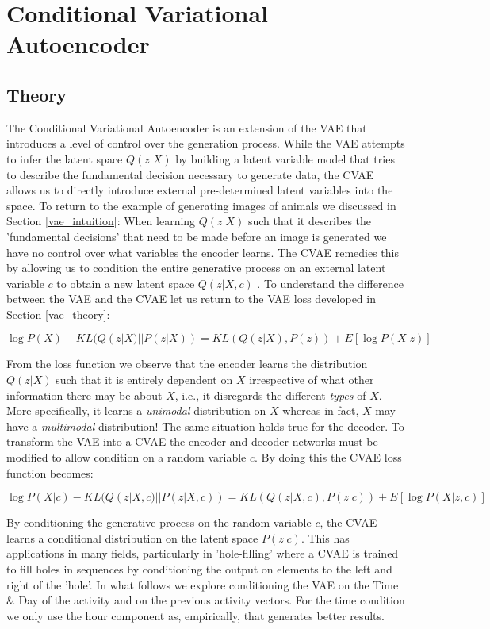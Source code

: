 \section{Conditional Variational Autoencoder}
\subsection{Theory}
The Conditional Variational Autoencoder is an extension of the VAE that introduces a level of control over the generation process. While the VAE attempts to infer the latent space $Q(z|X)$ by building a latent variable model that tries to describe the fundamental decision necessary to generate data, the CVAE allows us to directly introduce external pre-determined latent variables into the space. To return to the example of generating images of animals we discussed in Section \ref{vae_intuition}: When learning $Q(z|X)$ such that it describes the 'fundamental decisions' that need to be made before an image is generated we have no control over what variables the encoder learns. The CVAE remedies this by allowing us to condition the entire generative process on an external latent variable $c$ to obtain a new latent space $Q(z|X,c)$ \citep{sohn2015learning}. To understand the difference between the VAE and the CVAE let us return to the VAE loss developed in Section \ref{vae_theory}:

\begin{equation}
  \log P(X) - KL(Q(z|X) || P(z|X)) =  KL (Q(z|X), P(z)) + E[\log P(X|z)]
\end{equation}

From the loss function we observe that the encoder learns the distribution $Q(z|X)$ such that it is entirely dependent on $X$ irrespective of what other information there may be about $X$, i.e., it disregards the different \textit{types} of $X$. More specifically, it learns a \textit{unimodal} distribution on $X$ whereas in fact, $X$ may have a \textit{multimodal} distribution! The same situation holds true for the decoder. To transform the VAE into a CVAE the encoder and decoder networks must be modified to allow condition on a random variable $c$. By doing this the CVAE loss function becomes:

\begin{equation}
  \log P(X|c) - KL(Q(z|X,c) || P(z|X,c)) =  KL (Q(z|X,c), P(z|c)) + E[\log P(X|z,c)]
\end{equation}

By conditioning the generative process on the random variable $c$, the CVAE learns a conditional distribution on the latent space $P(z|c)$. This has applications in many fields, particularly in 'hole-filling' \citep{doersch2016tutorial} where a CVAE is trained to fill holes in sequences by conditioning the output on elements to the left and right of the 'hole'. In what follows we explore conditioning the VAE on the Time \& Day of the activity and on the previous activity vectors. For the time condition we only use the hour component as, empirically, that generates better results.

